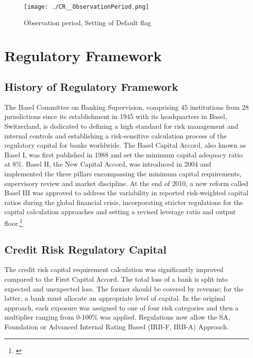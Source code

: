 \begin{figure}[H]
	\centering
	\texttt{[image: ./CR\_\_ObservationPeriod.png]}
    \caption{Observation period, Setting of Default flag}
    \label{fig:cr_timeperiod}
\end{figure}

\vspace{-1cm}
\section{Regulatory Framework}

\subsection{History of Regulatory Framework}

The Basel Committee on Banking Supervision, comprising 45 institutions from 28 jurisdictions since its establishment in 1945 with its headquarters in Basel, Switzerland, is dedicated to defining a high standard for risk management and internal controls and establishing a risk-sensitive calculation process of the regulatory capital for banks worldwide. The Basel Capital Accord, also known as Basel I, was first published in 1988 and set the minimum capital adequacy ratio at 8\%. Basel II, the New Capital Accord, was introduced in 2004 and implemented the three pillars encompassing the minimum capital requirements, supervisory review and market discipline. At the end of 2010, a new reform called Basel III was approved to address the variability in reported risk-weighted capital ratios during the global financial crisis, incorporating stricter regulations for the capital calculation approaches and setting a revised leverage ratio and output floor.\footnote{\cite{BCBS:2023}}

\subsection{Credit Risk Regulatory Capital}

The credit risk capital requirement calculation was significantly improved compared to the First Capital Accord. The total loss of a bank is split into expected and unexpected loss. The former should be covered by revenue; for the latter, a bank must allocate an appropriate level of capital. In the original approach, each exposure was assigned to one of four risk categories and then a multiplier ranging from 0-100\% was applied. Regulations now allow the \ac{SA}, Foundation or Advanced Internal Rating Based (IRB-F, IRB-A) Approach. 

